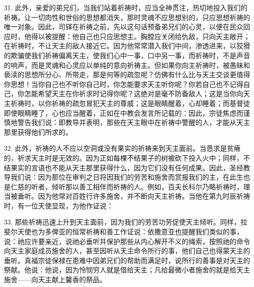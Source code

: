 31. 此外，亲爱的弟兄们，当我们站着祈祷时，应当全神贯注，热切地投入我们的祈祷。让一切肉性和世俗的思想都消失，那时灵魂不应思想别的，只应思想祈祷的唯一对象。因此，司铎在祈祷之前，先以这句话预备弟兄们的心灵，以便在民众回应时，他得以被提醒：他自己也只应思想主。胸膛应关闭给仇敌，只向天主敞开；在祈祷时，不让天主的敌人接近它。因为他常常潜入我们中间，渗透进来，以狡猾的欺骗使我们祈祷偏离天主，使我们心中一事，口中另一事，而祈祷时，不是声音的响声，而是灵魂和心灵应以单纯的意向祈祷主。但如果你向主祈祷时，被愚昧和亵渎的思想所分心、所带走，那是何等的疏忽呢？仿佛有什么比与天主交谈更值得你思想！当你自己也不听你自己时，你怎能要求天主听你呢？你若自己也不记得自己，你怎能希望天主在你祈求时记得你呢？这绝对是毫不防备敌人；这是当你向天主祈祷时，以你祈祷的疏忽冒犯天主的尊威；这是眼睛醒着，心却睡着；而基督徒即使眼睛睡了，心也应当醒着，正如在中教会发言所记载的：因此，宗徒焦虑而谨慎地警告我们说：即教导并表明，那些在天主眼中在祈祷中警醒的人，才能从天主那里获得他们所求的。\par

32. 此外，祈祷的人不应以空洞或没有果实的祈祷来到天主面前。当恳求是贫瘠的，祈求天主时是无效的。因为正如每棵不结果子的树被砍下投入火中；同样，不结果实的言语也不能从天主那里获得什么，因为它们没有任何成果。因此，圣经教导我们说：因为那位在审判之日将因我们的劳苦和施舍而赏报我们的主，在此生也是仁慈的听者，倾听那以善工相伴而祈祷的人。例如，百夫长科尔乃略祈祷时，理当被垂听。因为他常对百姓行许多施舍，并不断向天主祈祷。当他在第九时辰祈祷时，有一位天使显现，为他作证说：\par

33. 那些祈祷迅速上升到天主面前，因为我们的劳苦功劳促使天主倾听。同样，拉斐尔天使也为多俾亚的恒常祈祷和善工作证说：依撒意亚也提醒我们类似的事，说：祂应许要亲近，说祂必垂听并保护那些从内心解开不义的绳索，按照祂的命令向天主家庭成员施舍的人，甚至因听从天主命令所行的事，他们自己也得蒙天主的垂听。真福宗徒保禄在患难中因弟兄们的帮助而满足时，说所行的善事是对天主的祭献。他说：他说，因为怜悯穷人就是借给天主；凡给最微小者施舍的就是给天主施舍——向天主献上馨香的祭品。\par

